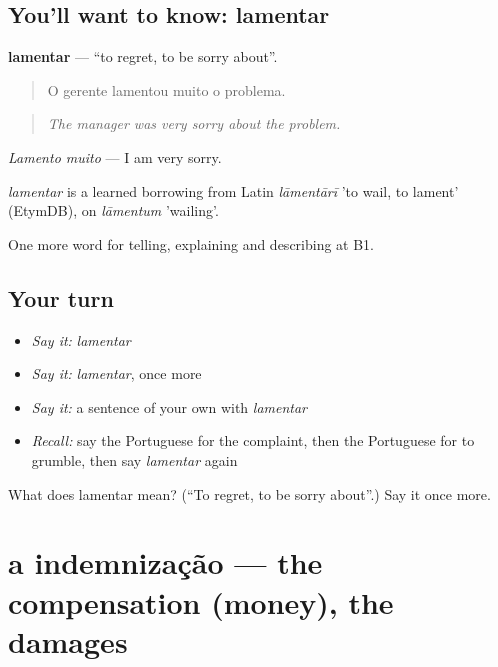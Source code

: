 \subsection*{You'll want to know: lamentar}
\textbf{lamentar} — \textquotedblleft{}to regret, to be sorry about\textquotedblright{}.

\begin{quote}
O gerente lamentou muito o problema.
\end{quote}

\begin{quote}
\emph{The manager was very sorry about the problem.}
\end{quote}

\emph{Lamento muito} — I am very sorry.

\begin{cousinweb}
\emph{lamentar} is a learned borrowing from Latin \emph{lāmentārī} 'to wail, to lament' (EtymDB), on \emph{lāmentum} 'wailing'.
\end{cousinweb}

\begin{grammarlens}[title={What you've built}]
One more word for telling, explaining and describing at B1.
\end{grammarlens}

\subsection*{Your turn}
\begin{itemize}
\raggedright
  \item \emph{Say it:} \emph{lamentar}
  \item \emph{Say it:} \emph{lamentar}, once more
  \item \emph{Say it:} a sentence of your own with \emph{lamentar}
  \item \emph{Recall:} say the Portuguese for the complaint, then the Portuguese for to grumble, then say \emph{lamentar} again
\end{itemize}

\begin{tcolorbox}[breakable,colback=teal!4,colframe=teal!35!black,title={Before you move on}]
What does lamentar mean? (\textquotedblleft{}To regret, to be sorry about\textquotedblright{}.) Say it once more.
\end{tcolorbox}
\section[a indemnização]{a indemnização — the compensation (money), the damages}

